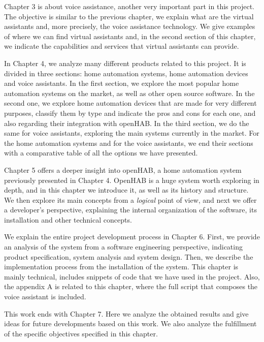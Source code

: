 Chapter 3 is about voice assistance, another very important part in this project. The objective is similar to the previous
chapter, we explain what are the virtual assistants and, more precisely, the voice assistance technology. We give examples of where
we can find virtual assistants and, in the second section of this chapter, we indicate the capabilities and services that virtual
assistants can provide.

In Chapter 4, we analyze many different products related to this project. It is divided in three sections: home automation
systems, home automation devices and voice assistants. In the first section, we explore the most popular home automation systems
on the market, as well as other open source software. In the second one, we explore home automation devices that are made for very
different purposes, classify them by type and indicate the pros and cons for each one, and also regarding their integration with openHAB.
In the third section, we do the same for voice assistants, exploring the main systems currently in the market. For the home automation
systems and for the voice assistants, we end their sections with a comparative table of all the options we have presented.

Chapter 5 offers a deeper insight into openHAB, a home automation system previously presented in Chapter 4. OpenHAB is a
huge system worth exploring in depth, and in this chapter we introduce it, as well as its history and structure. We then explore its
main concepts from a \textit{logical} point of view, and next we offer a developer's perspective, explaining the internal organization
of the software, its installation and other technical concepts.

We explain the entire project development process in Chapter 6. First, we provide an analysis of the system from a software
engineering perspective, indicating product specification, system analysis and system design. Then, we describe the implementation
process from the installation of the system. This chapter is mainly technical, includes snippets of code that we have used in the
project. Also, the appendix A is related to this chapter, where the full script that composes the voice assistant is included.

This work ends with Chapter 7. Here we analyze the obtained results and give ideas for future developments based on this
work. We also analyze the fulfillment of the specific objectives specified in this chapter.
